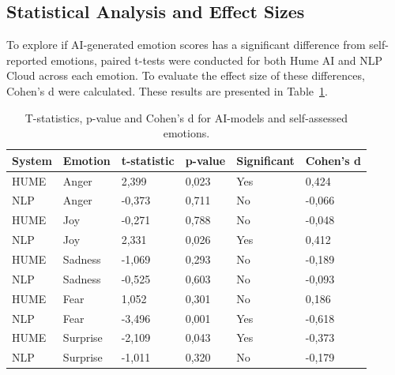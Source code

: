 \newpage 
\subsection{Statistical Analysis and Effect Sizes}

To explore if AI-generated emotion scores has a significant difference from self-reported emotions, paired t-tests were conducted for both Hume AI and NLP Cloud across each emotion. 
To evaluate the effect size of these differences, Cohen's d were calculated. These results are presented in Table~\ref{tab:t-test-rq3}.
\begin{table}[!h]
    \centering
    \begin{tabular}{l|lllll}
    \textbf{System} & \textbf{Emotion} & \textbf{t-statistic} & \textbf{p-value} & \textbf{Significant} & \textbf{Cohen's d} \\ \hline
    HUME            & Anger            & 2,399                & 0,023            & Yes                  & 0,424              \\
    NLP             & Anger            & -0,373               & 0,711            & No                   & -0,066             \\
    HUME            & Joy              & -0,271               & 0,788            & No                   & -0,048             \\
    NLP             & Joy              & 2,331                & 0,026            & Yes                  & 0,412              \\
    HUME            & Sadness          & -1,069               & 0,293            & No                   & -0,189             \\
    NLP             & Sadness          & -0,525               & 0,603            & No                   & -0,093             \\
    HUME            & Fear             & 1,052                & 0,301            & No                   & 0,186              \\
    NLP             & Fear             & -3,496               & 0,001            & Yes                  & -0,618             \\
    HUME            & Surprise         & -2,109               & 0,043            & Yes                  & -0,373             \\
    NLP             & Surprise         & -1,011               & 0,320            & No                   & -0,179            
    \end{tabular}
    \caption{T-statistics, p-value and Cohen's d for AI-models and self-assessed emotions.}
    \label{tab:t-test-rq3}
\end{table}

